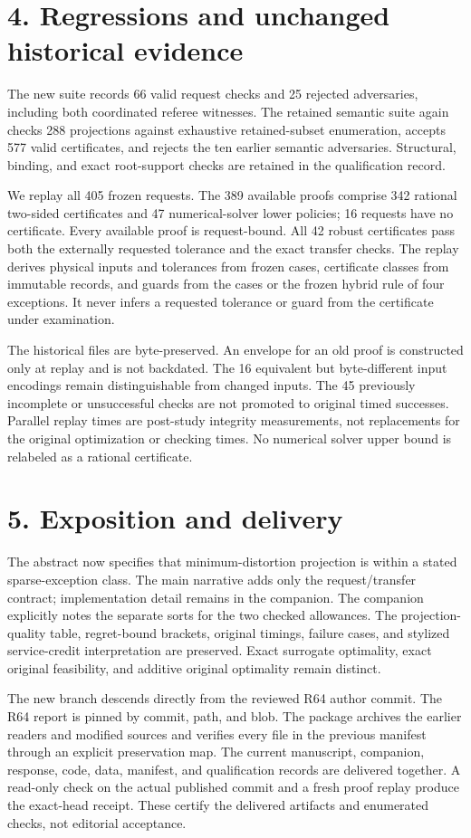 \documentclass[11pt,letterpaper]{article}
\begin{document}
\section*{4. Regressions and unchanged historical evidence}
The new suite records 66 valid request checks and 25 rejected adversaries, including both coordinated referee witnesses. The retained semantic suite again checks 288 projections against exhaustive retained-subset enumeration, accepts 577 valid certificates, and rejects the ten earlier semantic adversaries. Structural, binding, and exact root-support checks are retained in the qualification record.

We replay all 405 frozen requests. The 389 available proofs comprise 342 rational two-sided certificates and 47 numerical-solver lower policies; 16 requests have no certificate. Every available proof is request-bound. All 42 robust certificates pass both the externally requested tolerance and the exact transfer checks. The replay derives physical inputs and tolerances from frozen cases, certificate classes from immutable records, and guards from the cases or the frozen hybrid rule of four exceptions. It never infers a requested tolerance or guard from the certificate under examination.

The historical files are byte-preserved. An envelope for an old proof is constructed only at replay and is not backdated. The 16 equivalent but byte-different input encodings remain distinguishable from changed inputs. The 45 previously incomplete or unsuccessful checks are not promoted to original timed successes. Parallel replay times are post-study integrity measurements, not replacements for the original optimization or checking times. No numerical solver upper bound is relabeled as a rational certificate.

\section*{5. Exposition and delivery}
The abstract now specifies that minimum-distortion projection is within a stated sparse-exception class. The main narrative adds only the request/transfer contract; implementation detail remains in the companion. The companion explicitly notes the separate sorts for the two checked allowances. The projection-quality table, regret-bound brackets, original timings, failure cases, and stylized service-credit interpretation are preserved. Exact surrogate optimality, exact original feasibility, and additive original optimality remain distinct.

The new branch descends directly from the reviewed R64 author commit. The R64 report is pinned by commit, path, and blob. The package archives the earlier readers and modified sources and verifies every file in the previous manifest through an explicit preservation map. The current manuscript, companion, response, code, data, manifest, and qualification records are delivered together. A read-only check on the actual published commit and a fresh proof replay produce the exact-head receipt. These certify the delivered artifacts and enumerated checks, not editorial acceptance.
\end{document}
